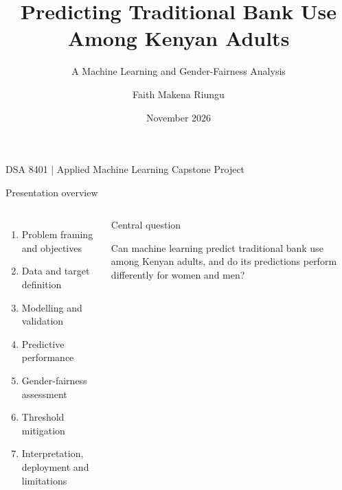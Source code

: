 \documentclass[aspectratio=169,10pt]{beamer}
\title[Traditional Bank Use in Kenya]{
    Predicting Traditional Bank Use Among Kenyan Adults
}
\subtitle{
    A Machine Learning and Gender-Fairness Analysis
}
\author{
    Faith Makena Riungu
}
\institute{
    School of Computing and Engineering Sciences\\
    Strathmore University
}
\date{November 2026}
\begin{document}

{

\begin{frame}[plain]


\titlepage

\begin{center}
    \small
    DSA 8401 | Applied Machine Learning Capstone Project
\end{center}

\end{frame}
}


\begin{frame}{Presentation overview}

\begin{columns}[T,onlytextwidth]


\begin{enumerate}
    \item Problem framing and objectives
    \item Data and target definition
    \item Modelling and validation
    \item Predictive performance
    \item Gender-fairness assessment
    \item Threshold mitigation
    \item Interpretation, deployment and limitations
\end{enumerate}


\begin{block}{Central question}

Can machine learning predict traditional bank use among Kenyan adults, and do its predictions perform differently for women and men?

\end{block}

\end{columns}

\end{frame}
\end{document}
